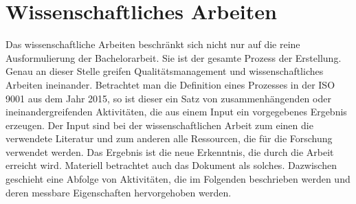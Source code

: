 \section{Wissenschaftliches Arbeiten}
Das wissenschaftliche Arbeiten beschränkt sich nicht nur auf die reine Ausformulierung der Bachelorarbeit. Sie ist der gesamte Prozess der Erstellung. Genau an dieser Stelle greifen Qualitätsmanagement und wissenschaftliches Arbeiten ineinander. Betrachtet man die Definition eines Prozesses in der \ac{ISO} 9001 aus dem Jahr 2015, so ist dieser ein Satz von zusammenhängenden oder ineinandergreifenden Aktivitäten, die aus einem Input ein vorgegebenes Ergebnis erzeugen.\cite[Vgl.][]{iso9001:2015}
Der Input sind bei der wissenschaftlichen Arbeit zum einen die verwendete Literatur und zum anderen alle Ressourcen, die für die Forschung verwendet werden. Das Ergebnis ist die neue Erkenntnis, die durch die Arbeit erreicht wird. Materiell betrachtet auch das Dokument als solches. Dazwischen geschieht eine Abfolge von Aktivitäten, die im Folgenden beschrieben werden und deren messbare Eigenschaften hervorgehoben werden.

